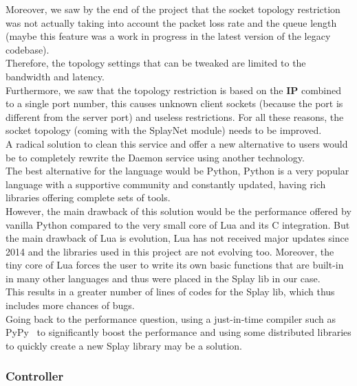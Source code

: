 \documentclass{eplmastersthesis}
\begin{document}
          Moreover, we saw by the end of the project that the socket
          topology restriction was not actually taking into account
          the packet loss rate and the queue length (maybe this feature was
          a work in progress in the latest version of the legacy codebase).\\
          Therefore, the topology settings that can be tweaked are limited to
          the bandwidth and latency.\\
          Furthermore, we saw that the topology restriction is based on the
          \textbf{IP} combined to a single port number, this causes unknown
          client sockets (because the port is different from the server port)
          and useless restrictions. For all these reasons, the socket topology
          (coming with the SplayNet module) needs to be improved.\\

          A radical solution to clean this service and offer a new alternative
          to users would be to completely rewrite the Daemon service using
          another technology.\\
          The best alternative for the language would be Python, Python is a
          very popular language with a supportive community and constantly
          updated, having rich libraries offering complete sets of tools.\\
          However, the main drawback of this solution would be the performance
          offered by vanilla Python compared to the very small core of Lua and
          its C integration. But the main drawback of Lua is evolution, Lua has
          not received major updates since 2014 and the libraries used in this
          project are not evolving too. Moreover, the tiny core of Lua forces
          the user to write its own basic functions that are built-in in many
          other languages and thus were placed in the Splay lib in our case.\\
          This results in a greater number of lines of codes for the Splay lib,
          which thus includes more chances of bugs.\\
          Going back to the performance question, using a just-in-time compiler
          such as PyPy~\cite{PyPy} to significantly boost the performance and
          using some distributed libraries to quickly create a new Splay library
          may be a solution.

        \subsubsection{Controller}
\end{document}
